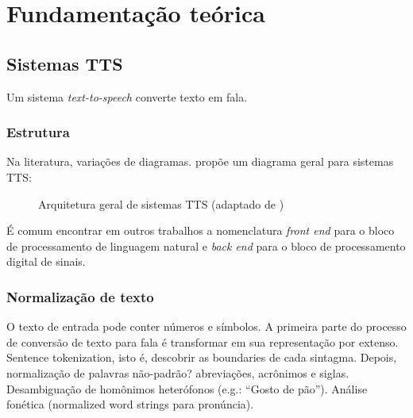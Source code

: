 

\chapter{Fundamentação teórica}
\section{Sistemas TTS}
Um sistema \emph{text-to-speech} converte texto em fala.
\subsection{Estrutura}
Na literatura, variações de diagramas.  propõe um
diagrama geral para sistemas TTS:

\begin{figure}[!htbp]
\centering
{}
\caption{Arquitetura geral de sistemas TTS (adaptado de )}
\label{fig:tts-arch}
\end{figure}

É comum encontrar em outros trabalhos a nomenclatura \emph{front end} para o
bloco de processamento de linguagem natural e \emph{back end} para o bloco de
processamento digital de sinais.

\subsection{Normalização de texto}
O texto de entrada pode conter números e símbolos. A primeira parte do processo de conversão de texto para fala é transformar em sua representação por extenso.
Sentence tokenization, isto é, descobrir as boundaries de cada sintagma. Depois,
normalização de palavras não-padrão? abreviações, acrônimos e siglas.
Desambiguação de homônimos heterófonos (e.g.: ``Gosto de pão''). Análise
fonética (normalized word strings para pronúncia).

